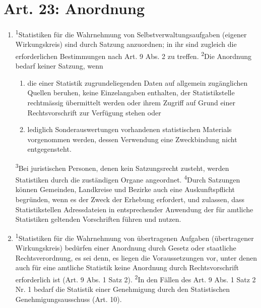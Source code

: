     \section{Art. 23: Anordnung}
        \begin{enumerate}[label=(\arabic*)]
            \item \textsuperscript{1}Statistiken für die Wahrnehmung von Selbstverwaltungsaufgaben (eigener Wirkungskreis) sind durch Satzung anzuordnen; in ihr sind zugleich die erforderlichen Bestimmungen nach Art. 9 Abs. 2 zu treffen. \textsuperscript{2}Die Anordnung bedarf keiner Satzung, wenn
                \begin{enumerate}[label=\arabic*.]
                    \item die einer Statistik zugrundeliegenden Daten auf allgemein zugänglichen Quellen beruhen, keine Einzelangaben enthalten, der Statistikstelle rechtmässig übermittelt werden oder ihrem Zugriff auf Grund einer Rechtsvorschrift zur Verfügung stehen oder
                    \item lediglich Sonderauswertungen vorhandenen statistischen Materials vorgenommen werden, dessen Verwendung eine Zweckbindung nicht entgegensteht.
                \end{enumerate}
                \textsuperscript{3}Bei juristischen Personen, denen kein Satzungsrecht zusteht, werden Statistiken durch die zuständigen Organe angeordnet. \textsuperscript{4}Durch Satzungen können Gemeinden, Landkreise und Bezirke auch eine Auskunftspflicht begründen, wenn es der Zweck der Erhebung erfordert, und zulassen, dass Statistikstellen Adressdateien in entsprechender Anwendung der für amtliche Statistiken geltenden Vorschriften führen und nutzen.
            \item \textsuperscript{1}Statistiken für die Wahrnehmung von übertragenen Aufgaben (übertragener Wirkungskreis) bedürfen einer Anordnung durch Gesetz oder staatliche Rechtsverordnung, es sei denn, es liegen die Voraussetzungen vor, unter denen auch für eine amtliche Statistik keine Anordnung durch Rechtsvorschrift erforderlich ist (Art. 9 Abs. 1 Satz 2). \textsuperscript{2}In den Fällen des Art. 9 Abs. 1 Satz 2 Nr. 1 bedarf die Statistik einer Genehmigung durch den Statistischen Genehmigungsausschuss (Art. 10).
        \end{enumerate}

